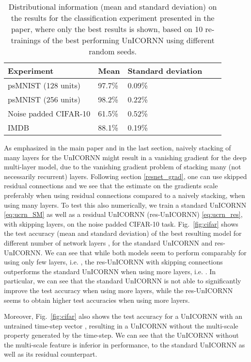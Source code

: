 \documentclass[a4paper]{article}
\newcommand{\fref}[1] {Fig.~\ref{#1}}
\begin{document}
\begin{table}[h!]
  \caption{Distributional information (mean and standard deviation) on the results for the classification experiment presented in the paper, where only the best results is shown, based on 10 re-trainings of the best performing UnICORNN using different random seeds.}
  \label{tab:distr_results}
  \centering
  \begin{tabular}{lllll}
    \toprule
    \cmidrule(r){1-3}
    Experiment & Mean & Standard deviation \\
        \midrule
    psMNIST (128 units) & 97.7\% &  0.09\%\\
    psMNIST (256 units) & 98.2\% & 0.22\% \\
    Noise padded CIFAR-10 & 61.5\% & 0.52\%\\
    IMDB & 88.1\% & 0.19\% \\
    \bottomrule
  \end{tabular}
\end{table}

As emphasized in the main paper and in the last section, naively stacking of many layers for the UnICORNN might result in a vanishing gradient for the deep multi-layer model, due to the vanishing gradient problem of stacking many (not necessarily recurrent) layers. Following section \ref{resnet_grad}, one can use skipped residual connections and we see that the estimate on the gradients scale preferably when using residual connections compared to a naively stacking, when using many layers. To test this also numerically, we train a standard UnICORNN \eqref{eq:ucrn_SM} as well as a residual UnICORNN (res-UnICORNN) \eqref{eq:ucrn_res}, with  skipping layers, on the noise padded CIFAR-10 task.  
\fref{fig:cifar} shows the test accuracy (mean and standard deviation) of the best resulting model for different number of network layers , for the standard UnICORNN and res-UnICORNN. We can see that while both models seem to perform comparably for using only few layers, i.e. , the res-UnICORNN with  skipping connections outperforms the standard UnICORNN when using more layers, i.e. . In particular, we can see that the standard UnICORNN is not able to significantly improve the test accuracy when using more layers, while the res-UnICORNN seems to obtain higher test accuracies when using more layers. 

Moreover, \fref{fig:cifar} also shows the test accuracy for a UnICORNN with an untrained time-step vector , resulting in a UnICORNN without the multi-scale property generated by the time-step. We can see that the UnICORNN without the multi-scale feature is inferior in performance, to the standard UnICORNN as well as its residual counterpart.   
\end{document}
